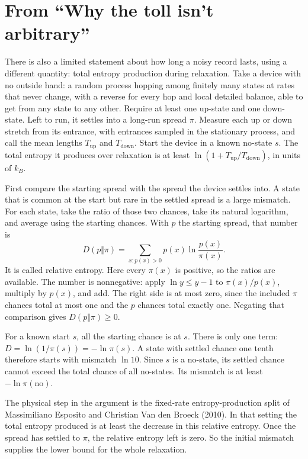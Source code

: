 \documentclass[11pt,twoside]{article}
\theoremstyle{thielethm}
\theoremstyle{thieledef}
\theoremstyle{thieledef}
\theoremstyle{thieledef}
\theoremstyle{thielethm}
\theoremstyle{thieleobs}
\theoremstyle{thielethm}
\begin{document}
\section{From ``Why the toll isn't arbitrary''}
There is also a limited statement about how long a noisy record lasts, using a different
quantity: total entropy production during relaxation. Take a device with no outside hand:
a random process hopping among finitely many states at rates that never change, with a
reverse for every hop and local detailed balance, able to get from any state to any other.
Require at least one up-state and one down-state. Left to run, it settles into a long-run
spread $\pi$. Measure each up or down stretch from its entrance, with entrances sampled
in the stationary process, and call the mean lengths $T_{\mathrm{up}}$ and
$T_{\mathrm{down}}$. Start the device in a known no-state $s$. The total entropy it
produces over relaxation is at least
$\ln(1+T_{\mathrm{up}}/T_{\mathrm{down}})$, in units of $k_B$.

First compare the starting spread with the spread the device settles into. A state
that is common at the start but rare in the settled spread is a large mismatch.
For each state, take the ratio of those two chances, take its natural logarithm,
and average using the starting chances. With $p$ the starting spread, that number is
\[
D(p\Vert\pi)=\sum_{x:p(x)>0}p(x)\ln\frac{p(x)}{\pi(x)}.
\]
It is called relative entropy. Here every $\pi(x)$ is positive, so the ratios are
available. The number is nonnegative: apply $\ln y\le y-1$ to $\pi(x)/p(x)$,
multiply by $p(x)$, and add. The right side is at most zero, since the included
$\pi$ chances total at most one and the $p$ chances total exactly one.
Negating that comparison gives $D(p\Vert\pi)\ge0$.

For a known start $s$, all the starting chance is at $s$. There is only one term:
$D=\ln(1/\pi(s))=-\ln\pi(s)$. A state with settled chance one tenth therefore
starts with mismatch $\ln10$. Since $s$ is a no-state, its settled chance cannot
exceed the total chance of all no-states. Its mismatch is at least
$-\ln\pi(\mathrm{no})$.

The physical step in the argument is the fixed-rate entropy-production split of
Massimiliano Esposito and Christian Van den Broeck (2010). In that setting the total
entropy produced is at least the decrease in this relative entropy. Once the spread
has settled to $\pi$, the relative entropy left is zero. So the initial mismatch
supplies the lower bound for the whole relaxation.
\end{document}

